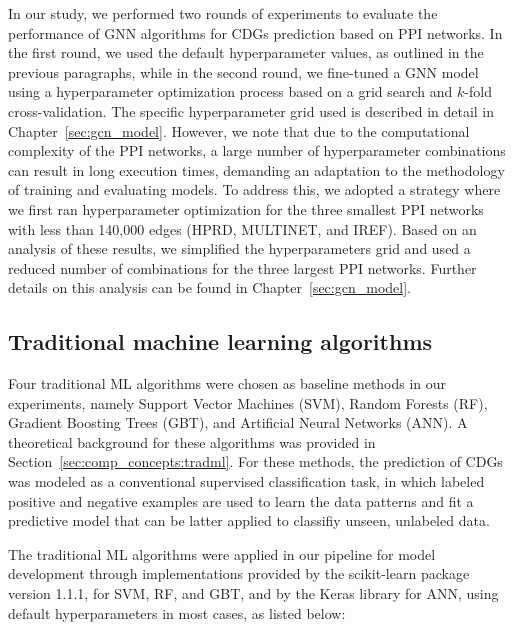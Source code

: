 In our study, we performed two rounds of experiments to evaluate the performance of GNN algorithms for CDGs prediction based on PPI networks. In the first round, we used the default hyperparameter values, as outlined in the previous paragraphs, while in the second round, we fine-tuned a GNN model using a hyperparameter optimization process based on a grid search and $k$-fold cross-validation. The specific hyperparameter grid used is described in detail in Chapter~\ref{sec:gcn_model}. However, we note that due to the computational complexity of the PPI networks, a large number of hyperparameter combinations can result in long execution times, demanding an adaptation to the methodology of training and evaluating models. To address this, we adopted a strategy where we first ran hyperparameter optimization for the three smallest PPI networks with less than 140,000 edges (HPRD, MULTINET, and IREF). Based on an analysis of these results, we simplified the hyperparameters grid and used a reduced number of combinations for the three largest PPI networks. Further details on this analysis can be found in Chapter~\ref{sec:gcn_model}.








\subsection{Traditional machine learning algorithms}

Four traditional ML algorithms were chosen as baseline methods in our experiments, namely Support Vector Machines (SVM), Random Forests (RF), Gradient Boosting Trees (GBT), and Artificial Neural Networks (ANN). A theoretical background for these algorithms was provided in Section~\ref{sec:comp_concepts:tradml}. For these methods, the prediction of CDGs was modeled as a conventional supervised classification task, in which labeled positive and negative examples are used to learn the data patterns and fit a predictive model that can be latter applied to classifiy unseen, unlabeled data.


The traditional ML algorithms were applied in our pipeline for model development through implementations provided by the scikit-learn package \cite{scikit-learn} version 1.1.1, for SVM, RF, and GBT, and by the Keras library \cite{chollet2015keras} for ANN, using default hyperparameters in most cases, as listed below: 



